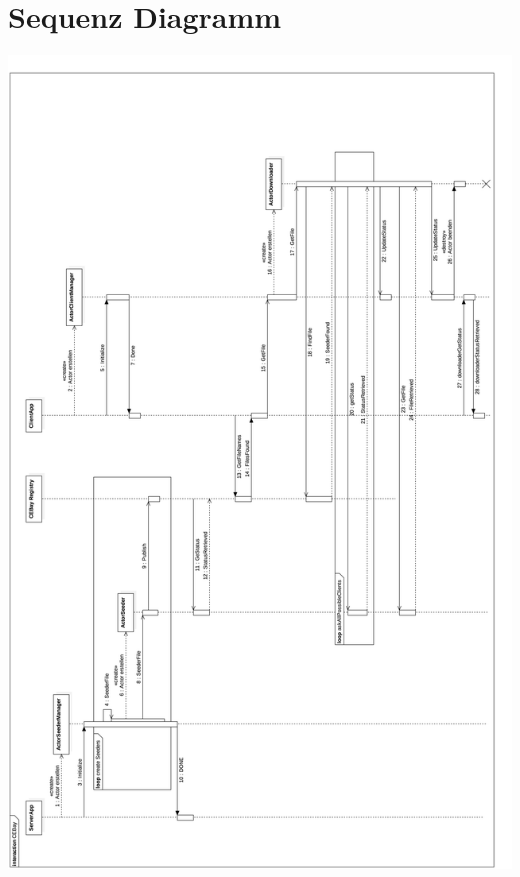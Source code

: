 \documentclass{scrartcl}
\begin{document}
\section{Sequenz Diagramm}
\label{sec:orga13b454}
\begin{center}
\includegraphics[height=.9\textheight]{sequence_diagram.png}
\end{center}
\end{document}
